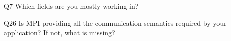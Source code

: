 \begin{description}%
\item{Q7} Which fields are you mostly working in?%
\item{Q26} Is MPI providing all the communication semantics required by your application? If not, what is missing?%
\end{description}%

